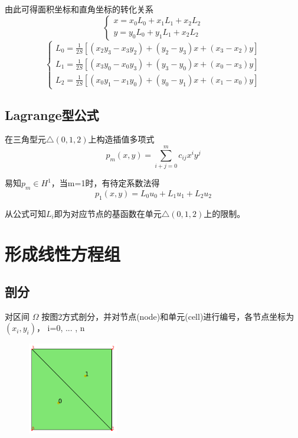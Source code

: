 \documentclass[UTF8,titlepage]{ctexart}
\begin{document}
由此可得面积坐标和直角坐标的转化关系
$$
\begin{cases}
	x = x_0 L_0 + x_1 L_1 + x_2 L_2 \\
	y = y_0 L_0 + y_1 L_1 + x_2 L_2
\end{cases}
$$
$$
	\begin{cases}
		L_0 = \frac{1}{2S} [(x_2 y_3 - x_3 y_2) + (y_2 - y_3) x + (x_3 - x_2) y] \\
		L_1 = \frac{1}{2S} [(x_3 y_0 - x_0 y_3) + (y_3 - y_0) x + (x_0 - x_3) y] \\
		L_2 = \frac{1}{2S} [(x_0 y_1 - x_1 y_0) + (y_0 - y_1) x + (x_1 - x_0) y]
	\end{cases} 
$$

\subsection{Lagrange型公式}

在三角型元$ \bigtriangleup(0,1,2) $上构造插值多项式
$$
	p_m(x,y) = \sum\limits_{i+j=0}^m c_{ij} x^i y^j
$$
\par
易知$p_m \in H^1$，当m=1时，有待定系数法得
$$
	p_1(x,y) = L_0 u_0 + L_1 u_1 + L_2 u_2
$$ 
\par
从公式可知$L_i$即为对应节点的基函数在单元$ \bigtriangleup(0,1,2) $上的限制。

\section{形成线性方程组}

\subsection{剖分}

对区间 $\Omega$ 按图2方式剖分，并对节点(node)和单元(cell)进行编号，各节点坐标为$(x_i,y_i)$， i=0, ... , n

\begin{figure}[hb]
	\centering
	\includegraphics[height=4cm,width=4cm]{../image/subdivsion.png}
	\caption{}
\end{figure}
\end{document}
